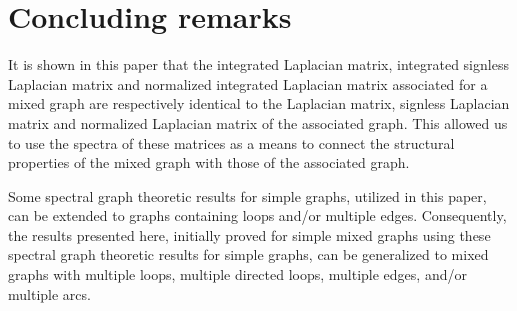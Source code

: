 \documentclass[12pt]{article}
\numberwithin{equation}{section}
\begin{document}
\section{Concluding remarks}
It is shown in this paper that the integrated Laplacian matrix, integrated signless Laplacian matrix and
normalized integrated Laplacian matrix associated for a mixed graph are respectively identical to the Laplacian matrix, signless Laplacian matrix and normalized Laplacian matrix of the associated graph. This allowed us to use the spectra of these matrices as a means to connect the structural properties of the mixed graph with those of the associated graph.

Some spectral graph theoretic results for simple graphs, utilized in this paper, can be extended to graphs containing loops and/or multiple edges. Consequently, the results presented here, initially proved for simple mixed graphs using these spectral graph theoretic results for simple graphs, can be generalized to mixed graphs with multiple loops, multiple directed loops, multiple edges, and/or multiple arcs.
\end{document}
